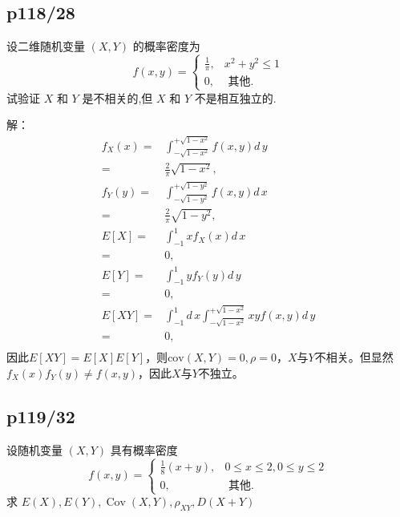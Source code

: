\documentclass[UTF8,a4paper,10pt]{ctexart}
\def\deriv{d\,}
\begin{document}
\subsection{p118/28}
设二维随机变量 $(X, Y)$ 的概率密度为
$$
f(x, y)= \begin{cases}\frac{1}{\pi}, & x^{2}+y^{2} \leqslant 1 \\ 0, & \text { 其他. }\end{cases}
$$
试验证 $X$ 和 $Y$ 是不相关的,但 $X$ 和 $Y$ 不是相互独立的.

解：
\begin{align}
    f_X(x) =& \int_{-\sqrt{1 - x^2}}^{+\sqrt{1 - x^2}}f(x, y)\deriv y \nonumber \\
           =& \frac{2}{\pi}\sqrt{1 - x^2}, \\
    f_Y(y) =& \int_{-\sqrt{1 - y^2}}^{+\sqrt{1 - y^2}}f(x, y)\deriv x \nonumber \\
           =& \frac{2}{\pi}\sqrt{1 - y^2}, \\
    E[X] =& \int_{-1}^{1}xf_X(x)\deriv x \nonumber \\
         =& 0, \\
    E[Y] =& \int_{-1}^{1}yf_Y(y)\deriv y \nonumber \\
         =& 0,\\
    E[XY] =& \int_{-1}^{1}\deriv x\int_{-\sqrt{1 - x^2}}^{+\sqrt{1 - x^2}}xyf(x, y)\deriv y \nonumber \\
          =& 0,\\
\end{align}
因此$E[XY] = E[X]E[Y]$，则$\mathrm{cov}(X,Y) = 0, \rho = 0$，$X$与$Y$不相关。但显然$f_X(x)f_Y(y) \not= f(x,y)$，因此$X$与$Y$不独立。


\subsection{p119/32}
设随机变量 $(X, Y)$ 具有概率密度
$$
f(x, y)= \begin{cases}\frac{1}{8}(x+y), & 0 \leqslant x \leqslant 2,0 \leqslant y \leqslant 2 \\ 0, & \text { 其他. }\end{cases}
$$
求 $E(X), E(Y), \operatorname{Cov}(X, Y), \rho_{X Y}, D(X+Y)$
\end{document}
